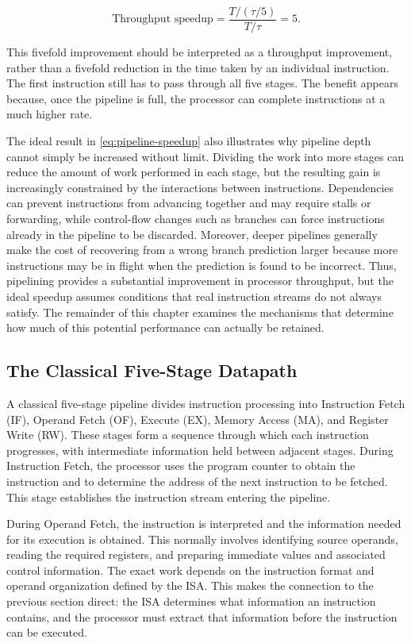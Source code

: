 \documentclass[12pt,a4paper]{report}
\begin{document}
\begin{equation}
\text{Throughput speedup} = \frac{T/(\tau/5)}{T/\tau} = 5.
\label{eq:pipeline-speedup}
\end{equation}

This fivefold improvement should be interpreted as a throughput improvement, rather than a fivefold reduction in the time taken by an individual instruction. The first instruction still has to pass through all five stages. The benefit appears because, once the pipeline is full, the processor can complete instructions at a much higher rate.

The ideal result in \cref{eq:pipeline-speedup} also illustrates why pipeline depth cannot simply be increased without limit. Dividing the work into more stages can reduce the amount of work performed in each stage, but the resulting gain is increasingly constrained by the interactions between instructions. Dependencies can prevent instructions from advancing together and may require stalls or forwarding, while control-flow changes such as branches can force instructions already in the pipeline to be discarded. Moreover, deeper pipelines generally make the cost of recovering from a wrong branch prediction larger because more instructions may be in flight when the prediction is found to be incorrect. Thus, pipelining provides a substantial improvement in processor throughput, but the ideal speedup assumes conditions that real instruction streams do not always satisfy. The remainder of this chapter examines the mechanisms that determine how much of this potential performance can actually be retained.~\cite{sarangi}

\subsection{The Classical Five-Stage Datapath}

A classical five-stage pipeline divides instruction processing into Instruction Fetch (IF), Operand Fetch (OF), Execute (EX), Memory Access (MA), and Register Write (RW). These stages form a sequence through which each instruction progresses, with intermediate information held between adjacent stages. During Instruction Fetch, the processor uses the program counter to obtain the instruction and to determine the address of the next instruction to be fetched. This stage establishes the instruction stream entering the pipeline.

During Operand Fetch, the instruction is interpreted and the information needed for its execution is obtained. This normally involves identifying source operands, reading the required registers, and preparing immediate values and associated control information. The exact work depends on the instruction format and operand organization defined by the ISA. This makes the connection to the previous section direct: the ISA determines what information an instruction contains, and the processor must extract that information before the instruction can be executed.
\end{document}
